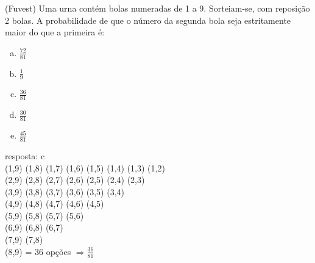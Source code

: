 \begin{ex}
(Fuvest) Uma urna contém bolas numeradas de 1 a 9. Sorteiam-se, com reposição 2 bolas. A probabilidade de que o número da segunda bola seja estritamente maior do que a primeira é:
   \begin{enumerate}[(a)]
   \item $\frac{72}{81}$
   \item $\frac{1}{9}$
   \item $\frac{36}{81}$
   \item $\frac{30}{81}$
   \item $\frac{45}{81}$
   \end{enumerate}
    \begin{sol}
      resposta: c \\
      (1,9) (1,8) (1,7) (1,6) (1,5) (1,4) (1,3) (1,2) \\
      (2,9) (2,8) (2,7) (2,6) (2,5) (2,4) (2,3) \\
      (3,9) (3,8) (3,7) (3,6) (3,5) (3,4) \\
      (4,9) (4,8) (4,7) (4,6) (4,5)\\
      (5,9) (5,8) (5,7) (5,6) \\
      (6,9) (6,8) (6,7) \\
      (7,9) (7,8) \\
      (8,9) = 36 opções
      $\Longrightarrow \frac{36}{81}$
    \end{sol}
\end{ex}